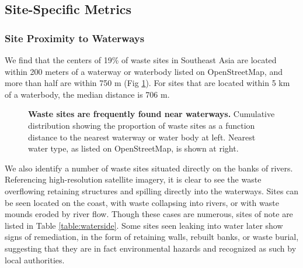 \documentclass[10pt,letterpaper]{article}
\begin{document}
\subsection*{Site-Specific Metrics}
\subsubsection*{Site Proximity to Waterways}
We find that the centers of 19\% of waste sites in Southeast Asia are located within 200 meters of a waterway or waterbody listed on OpenStreetMap, and more than half are within 750 m (Fig \ref{fig:waterway_distance}). For sites that are located within 5 km of a waterbody, the median distance is 706 m.

\begin{figure}[!h]
    \caption{{\bf Waste sites are frequently found near waterways.}
    Cumulative distribution showing the proportion of waste sites as a function distance to the nearest waterway or water body at left. Nearest water type, as listed on OpenStreetMap, is shown at right.}
    \label{fig:waterway_distance}
\end{figure}

We also identify a number of waste sites situated directly on the banks of rivers. Referencing high-resolution satellite imagery, it is clear to see the waste overflowing retaining structures and spilling directly into the waterways. Sites can be seen located on the coast, with waste collapsing into rivers, or with waste mounds eroded by river flow. Though these cases are numerous, sites of note are listed in Table \ref{table:waterside}. Some sites seen leaking into water later show signs of remediation, in the form of retaining walls, rebuilt banks, or waste burial, suggesting that they are in fact environmental hazards and recognized as such by local authorities.
\end{document}
